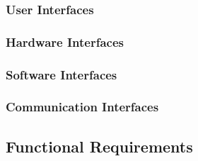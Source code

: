 \documentclass[a4paper]{article}
\begin{document}
\subsubsection{User Interfaces}

\subsubsection{Hardware Interfaces}

\subsubsection{Software Interfaces}

\subsubsection{Communication Interfaces}

\subsection{Functional Requirements}
\end{document}
